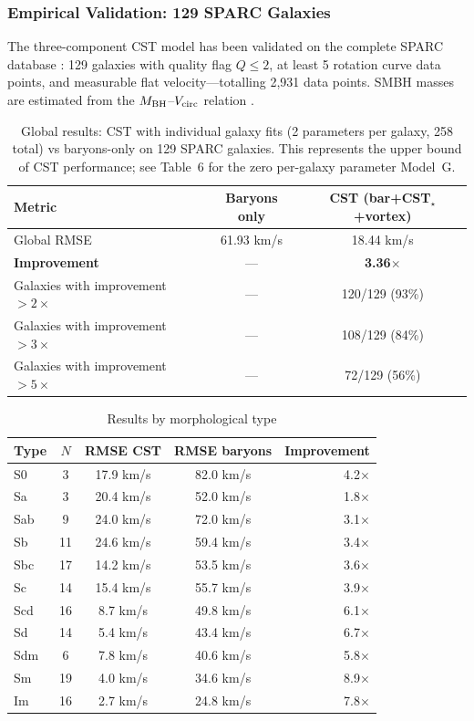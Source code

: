 \documentclass[10pt,a4paper]{article}
\begin{document}
\subsubsection{Empirical Validation: 129 SPARC Galaxies}

The three-component CST model has been validated on the complete SPARC database \cite{Lelli2016}: 129 galaxies with quality flag $Q \leq 2$, at least 5 rotation curve data points, and measurable flat velocity---totalling 2{,}931 data points. SMBH masses are estimated from the $M_{\rm BH}$--$V_{\rm circ}$ relation \cite{Davis2019}.

\begin{table}[h]
\centering
\caption{Global results: CST with individual galaxy fits (2 parameters per galaxy, 258 total) vs baryons-only on 129 SPARC galaxies. This represents the upper bound of CST performance; see Table~6 for the zero per-galaxy parameter Model~G.}
\begin{tabular}{lcc}
\toprule
Metric & Baryons only & CST (bar+CST$_\star$+vortex) \\
\midrule
Global RMSE & 61.93 km/s & 18.44 km/s \\
\textbf{Improvement} & --- & \textbf{3.36$\times$} \\
Galaxies with improvement $>2\times$ & --- & 120/129 (93\%) \\
Galaxies with improvement $>3\times$ & --- & 108/129 (84\%) \\
Galaxies with improvement $>5\times$ & --- & 72/129 (56\%) \\
\bottomrule
\end{tabular}
\end{table}

\begin{table}[h]
\centering
\caption{Results by morphological type}
\begin{tabular}{lcccr}
\toprule
Type & $N$ & RMSE CST & RMSE baryons & Improvement \\
\midrule
S0   & 3  & 17.9 km/s & 82.0 km/s & 4.2$\times$ \\
Sa   & 3  & 20.4 km/s & 52.0 km/s & 1.8$\times$ \\
Sab  & 9  & 24.0 km/s & 72.0 km/s & 3.1$\times$ \\
Sb   & 11 & 24.6 km/s & 59.4 km/s & 3.4$\times$ \\
Sbc  & 17 & 14.2 km/s & 53.5 km/s & 3.6$\times$ \\
Sc   & 14 & 15.4 km/s & 55.7 km/s & 3.9$\times$ \\
Scd  & 16 & 8.7 km/s  & 49.8 km/s & 6.1$\times$ \\
Sd   & 14 & 5.4 km/s  & 43.4 km/s & 6.7$\times$ \\
Sdm  & 6  & 7.8 km/s  & 40.6 km/s & 5.8$\times$ \\
Sm   & 19 & 4.0 km/s  & 34.6 km/s & 8.9$\times$ \\
Im   & 16 & 2.7 km/s  & 24.8 km/s & 7.8$\times$ \\
\bottomrule
\end{tabular}
\end{table}
\end{document}
